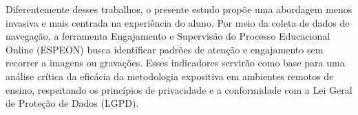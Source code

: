 Diferentemente desses trabalhos, o presente estudo propõe uma abordagem menos invasiva e mais centrada na experiência do aluno. Por meio da coleta de dados de navegação, a ferramenta Engajamento e Supervisão do Processo Educacional Online (ESPEON) busca identificar padrões de atenção e engajamento sem recorrer a imagens ou gravações. Esses indicadores servirão como base para uma análise crítica da eficácia da metodologia expositiva em ambientes remotos de ensino, respeitando os princípios de privacidade e a conformidade com a Lei Geral de Proteção de Dados (LGPD).
